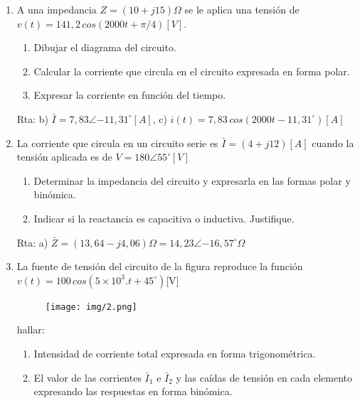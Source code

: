 \documentclass[10pt,a4paper]{article}
\begin{document}
\begin{enumerate}
\item A una impedancia $Z= (10 + j15)\Omega$ se le aplica una tensión de $v(t) = 141,2\, cos(2000 t + \pi / 4) [V]$.

\begin{enumerate}
	\item Dibujar el diagrama del circuito.
	\item Calcular la corriente que circula en el circuito expresada en forma polar.
	\item Expresar la corriente en función del tiempo.
\end{enumerate}


Rta: b) $\bar{I}=7,83\angle{-11,31^{\circ}}[A]$, c) $i(t)=7,83\,cos(2000t-11,31^{\circ})[A]$

\item La corriente que circula en un circuito serie es $\bar{I}=(4 + j12) [A]$ cuando la tensión aplicada es de $V=180 \angle{55^{\circ}}[V]$

\begin{enumerate}
	
	\item Determinar la impedancia del circuito y expresarla en las formas polar y binómica.

	\item Indicar si la reactancia es capacitiva o inductiva. Justifique.

\end{enumerate}
	
Rta: a) $\bar{Z}=(13,64-j4,06)\Omega=14,23\angle{-16,57^{\circ}}\Omega$


\item La fuente de tensión  del circuito de la figura reproduce la función $v(t)=100\,cos(5 \times 10^3.t + 45^{\circ})$[V] 

\begin{figure}[H]
	\centering
	\texttt{[image: img/2.png]}
	\label{e2}
\end{figure}

hallar:

\begin{enumerate}

\item Intensidad de corriente total expresada en forma trigonométrica.

\item El valor de las corrientes $\bar{I}_1$ e $\bar{I}_2$ y las caídas de tensión en cada elemento expresando las respuestas en forma binómica.


\end{enumerate}
\end{enumerate}
\end{document}

